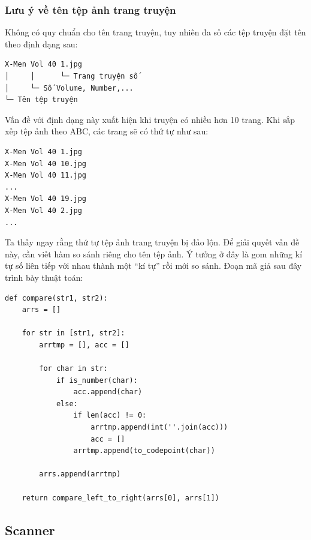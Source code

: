 \documentclass[../../../../thesis]{subfiles}
\begin{document}
\subsubsection{Lưu ý về tên tệp ảnh trang truyện}

Không có quy chuẩn cho tên trang truyện, tuy nhiên đa số các tệp truyện đặt tên
theo định dạng sau:

\begin{verbatim}
X-Men Vol 40 1.jpg
│     │      └─ Trang truyện số
│     └─ Số Volume, Number,...
└─ Tên tệp truyện
\end{verbatim}

Vấn đề với định dạng này xuất hiện khi truyện có nhiều hơn 10 trang. Khi sắp xếp
tệp ảnh theo ABC, các trang sẽ có thứ tự như sau:

\begin{verbatim}
X-Men Vol 40 1.jpg
X-Men Vol 40 10.jpg
X-Men Vol 40 11.jpg
...
X-Men Vol 40 19.jpg
X-Men Vol 40 2.jpg
...
\end{verbatim}

Ta thấy ngay rằng thứ tự tệp ảnh trang truyện bị đảo lộn. Để giải quyết vấn đề
này, cần viết hàm so sánh riêng cho tên tệp ảnh. Ý tưởng ở đây là gom những kí
tự số liên tiếp với nhau thành một ``kí tự'' rồi mới so sánh. Đoạn mã giả sau
đây trình bày thuật toán:

\begin{Verbatim}
def compare(str1, str2):
    arrs = []

    for str in [str1, str2]:
        arrtmp = [], acc = []

        for char in str:
            if is_number(char):
                acc.append(char)
            else:
                if len(acc) != 0:
                    arrtmp.append(int(''.join(acc)))
                    acc = []
                arrtmp.append(to_codepoint(char))

        arrs.append(arrtmp)

    return compare_left_to_right(arrs[0], arrs[1])
\end{Verbatim}



\subsection{Scanner}
\end{document}
